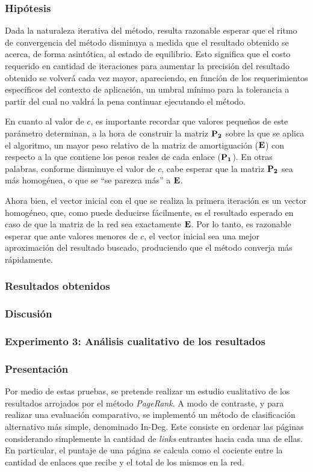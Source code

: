             \subsubsection*{Hipótesis}
            Dada la naturaleza iterativa del método, resulta razonable esperar que el ritmo de convergencia del método disminuya a medida que el resultado obtenido se acerca, de forma asintótica, al estado de equilibrio. Esto significa que el costo requerido en cantidad de iteraciones para aumentar la precisión del resultado obtenido se volverá cada vez mayor, apareciendo, en función de los requerimientos específicos del contexto de aplicación, un umbral mínimo para la tolerancia a partir del cual no valdrá la pena continuar ejecutando el método.

            En cuanto al valor de $c$, es importante recordar que valores pequeños de este parámetro determinan, a la hora de construir la matriz $\mathbf{P_2}$ sobre la que se aplica el algoritmo, un mayor peso relativo de la matriz de amortiguación ($\mathbf{E}$) con respecto a la que contiene los pesos reales de cada enlace ($\mathbf{P_1}$). En otras palabras, conforme disminuye el valor de $c$, cabe esperar que la matriz $\mathbf{P_2}$ sea más homogénea, o que se “se parezca más” a $\mathbf{E}$.

            Ahora bien, el vector inicial con el que se realiza la primera iteración es un vector homogéneo, que, como puede deducirse fácilmente, es el resultado esperado en caso de que la matriz de la red sea exactamente $\mathbf{E}$. Por lo tanto, es razonable esperar que ante valores menores de $c$, el vector inicial sea una mejor aproximación del resultado buscado, produciendo que el método converja más rápidamente.

            \subsubsection*{Resultados obtenidos}

            \subsubsection*{Discusión}

        \subsubsection{Experimento 3: Análisis cualitativo de los resultados}

            \subsubsection*{Presentación}
            Por medio de estas pruebas, se pretende realizar un estudio cualitativo de los resultados arrojados por el método \emph{PageRank}. A modo de contraste, y para realizar una evaluación comparativo, se implementó un método de clasificación alternativo más simple, denominado In-Deg. Este consiste en ordenar las páginas considerando simplemente la cantidad de \emph{links} entrantes hacia cada una de ellas. En particular, el puntaje de una página se calcula como el cociente entre la cantidad de enlaces que recibe y el total de los mismos en la red.

